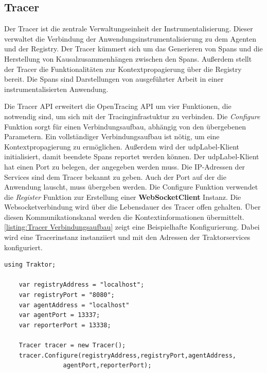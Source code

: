 \newpage 
\subsection{Tracer}
\label{subsection:Tracer}
Der Tracer ist die zentrale Verwaltungseinheit der Instrumentalisierung. Dieser verwaltet die Verbindung der Anwendungsinstrumentalisierung zu dem Agenten und der Registry. Der Tracer kümmert sich um das Generieren von Spans und die Herstellung von Kausalzusammenhängen zwischen den Spans. Außerdem stellt der Tracer die Funktionalitäten zur Kontextpropagierung über die Registry bereit. Die Spans sind Darstellungen von ausgeführter Arbeit in einer instrumentalisierten Anwendung. 

Die Tracer API erweitert die OpenTracing API um vier Funktionen, die notwendig sind, um sich mit der Tracinginfrastuktur zu verbinden. Die \emph{Configure} Funktion sorgt für einen Verbindungsaufbau, abhängig von den übergebenen Parametern. Ein vollständiger Verbindungsaufbau ist nötig, um eine Kontextpropagierung zu ermöglichen. Außerdem wird der \gls{udpLabel}-Klient initialisiert, damit beendete Spans reportet werden können. Der \gls{udpLabel}-Klient hat einen Port zu belegen, der angegeben werden muss. Die IP-Adressen der Services sind dem Tracer bekannt zu geben. Auch der Port auf der die Anwendung lauscht, muss übergeben werden. Die Configure Funktion verwendet die \emph{Register} Funktion zur Erstellung einer \textbf{WebSocketClient} Instanz. Die Websocketverbindung wird über die Lebensdauer des Tracer offen gehalten. Über diesen Kommunikationskanal werden die Kontextinformationen übermittelt. \cref{listing:Tracer Verbindungsaufbau} zeigt eine Beispielhafte Konfigurierung. Dabei wird eine Tracerinstanz instanziiert und mit den Adressen der Traktorservices konfiguriert.

\begin{minipage}[]{\textwidth}
	\begin{lstlisting}[frame=trBL]
	using Traktor;
	
	var registryAddress = "localhost";
	var registryPort = "8080";
	var agentAddress = "localhost"
	var agentPort = 13337;
	var reporterPort = 13338;
	
	Tracer tracer = new Tracer();
	tracer.Configure(registryAddress,registryPort,agentAddress,
				agentPort,reporterPort);
	
	\end{lstlisting}
	\label{listing:Tracer Verbindungsaufbau}
\end{minipage} 

